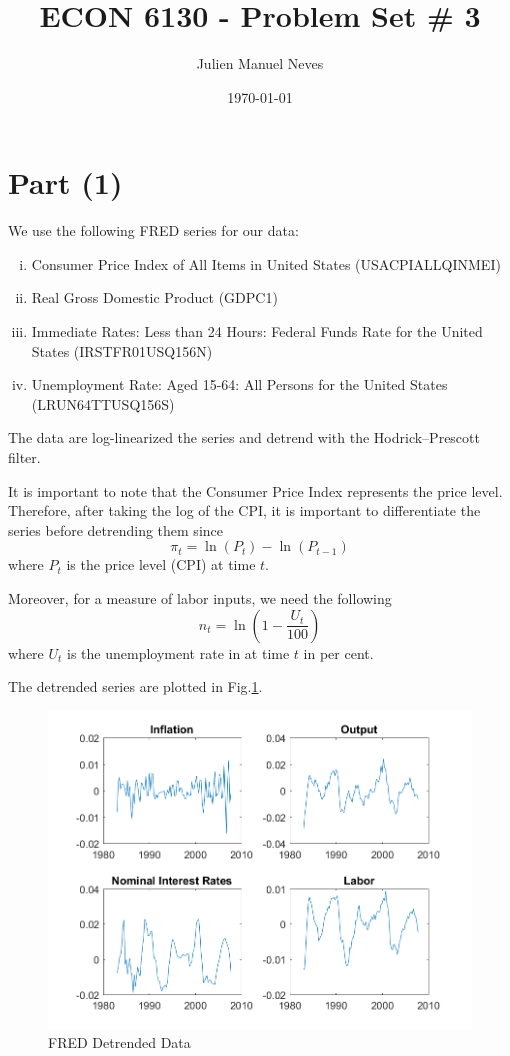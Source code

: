 \documentclass[12pt]{article}
\title{ECON 6130 - Problem Set \# 3}
\date{\today}
\author{Julien Manuel Neves}
\theoremstyle{definition}
\begin{document}
\maketitle

\section*{Part (1)}


We use the following FRED series for our data:
\begin{enumerate}[(i)]
	\item Consumer Price Index of All Items in United States (USACPIALLQINMEI)
	\item Real Gross Domestic Product (GDPC1)
	\item Immediate Rates: Less than 24 Hours: Federal Funds Rate for the United States (IRSTFR01USQ156N)
	\item Unemployment Rate: Aged 15-64: All Persons for the United States (LRUN64TTUSQ156S)
\end{enumerate} 

The data are log-linearized the series and detrend with the Hodrick–Prescott filter. 

It is important to note that the Consumer Price Index represents the price level. Therefore, after taking the log of the CPI, it is important to differentiate the series before detrending them since
\[
\pi_t = \ln(P_t)-\ln(P_{t-1})
\]
where $P_t$ is the price level (CPI) at time $t$.

Moreover, for a measure of labor inputs, we need the following
\[
n_t = \ln\left( 1-\frac{U_t}{100}\right) 
\]
where $U_t$ is the unemployment rate in at time $t$ in per cent.

The detrended series are plotted in Fig.\ref{fig:data}.

\begin{figure}[H]
	\centering
	\includegraphics[width=\linewidth]{data}
	\caption{FRED Detrended Data}
	\label{fig:data}
\end{figure}
\end{document}
